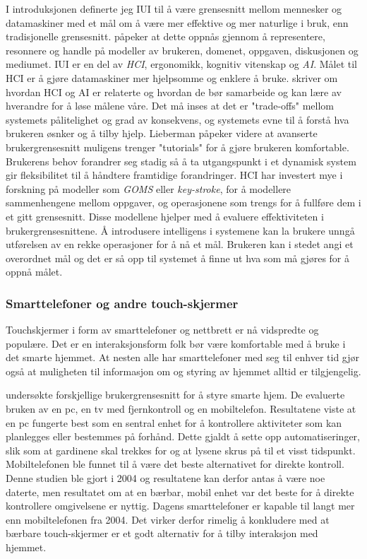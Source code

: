 I introduksjonen definerte jeg IUI til å være grensesnitt mellom mennesker og datamaskiner med et mål om å være mer effektive og mer naturlige i bruk, enn tradisjonelle grensesnitt. \citet{Kaufmann98} påpeker at dette oppnås gjennom å representere, resonnere og handle på modeller av brukeren, domenet, oppgaven, diskusjonen og mediumet. IUI er en del av \emph{HCI}, ergonomikk, kognitiv vitenskap og \emph{AI}. Målet til HCI er å gjøre datamaskiner mer hjelpsomme og enklere å bruke. \citet{Lieberman09} skriver om hvordan HCI og AI er relaterte og hvordan de bør samarbeide og kan lære av hverandre for å løse målene våre. Det må inses at det er "trade-offs" mellom systemets pålitelighet og grad av konsekvens, og systemets evne til å forstå hva brukeren øsnker og å tilby hjelp. Lieberman påpeker videre at avanserte brukergrensesnitt muligens trenger "tutorials" for å gjøre brukeren komfortable. Brukerens behov forandrer seg stadig så å ta utgangspunkt i et dynamisk system gir fleksibilitet til å håndtere framtidige forandringer. HCI har investert mye i forskning på modeller som \emph{GOMS} eller \emph{key-stroke}, for å modellere sammenhengene mellom oppgaver, og operasjonene som trengs for å fullføre dem i et gitt grensesnitt. Disse modellene hjelper med å evaluere effektiviteten i brukergrensesnittene. Å introdusere intelligens i systemene kan la brukere unngå utførelsen av en rekke operasjoner for å nå et mål. Brukeren kan i stedet angi et overordnet mål og det er så opp til systemet å finne ut hva som må gjøres for å oppnå målet.\\

\subsubsection*{Smarttelefoner og andre touch-skjermer}
Touchskjermer i form av smarttelefoner og nettbrett er nå vidspredte og populære. Det er en interaksjonsform folk bør være komfortable med å bruke i det smarte hjemmet. At nesten alle har smarttelefoner med seg til enhver tid gjør også at muligheten til informasjon om og styring av hjemmet alltid er tilgjengelig.

\citet{koskela04} undersøkte forskjellige brukergrensesnitt for å styre smarte hjem. De evaluerte bruken av en pc, en tv med fjernkontroll og en mobiltelefon. Resultatene viste at en pc fungerte best som en sentral enhet for å kontrollere aktiviteter som kan planlegges eller bestemmes på forhånd. Dette gjaldt å sette opp automatiseringer, slik som at gardinene skal trekkes for og at lysene skrus på til et visst tidspunkt. Mobiltelefonen ble funnet til å være det beste alternativet for direkte kontroll. Denne studien ble gjort i 2004 og resultatene kan derfor antas å være noe daterte, men resultatet om at en bærbar, mobil enhet var det beste for å direkte kontrollere omgivelsene er nyttig. Dagens smarttelefoner er kapable til langt mer enn mobiltelefonen fra 2004. Det virker derfor rimelig å konkludere med at bærbare touch-skjermer er et godt alternativ for å tilby interaksjon med hjemmet.\\

